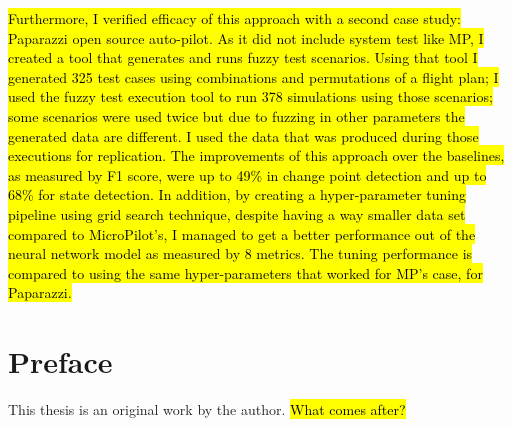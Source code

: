 \hl{Furthermore, I verified efficacy of this approach with a second case study: Paparazzi open source auto-pilot. As it did not include system test like MP, I created a tool that generates and runs fuzzy test scenarios. Using that tool I generated 325 test cases using combinations and permutations of a flight plan; I used the fuzzy test execution tool to run 378 simulations using those scenarios; some scenarios were used twice but due to fuzzing in other parameters the generated data are different. I used the data that was produced during those executions for replication. The improvements of this approach over the baselines, as measured by F1 score, were up to 49\% in change point detection and up to 68\% for state detection.
In addition, by creating a hyper-parameter tuning pipeline using grid search technique, despite having a way smaller data set compared to MicroPilot's, I managed to get a better performance out of the neural network model as measured by 8 metrics. The tuning performance is compared to using the same hyper-parameters that worked for MP's case, for Paparazzi.}%




\chapter{Preface}

This thesis is an original work by the author. \hl{What comes after?}


